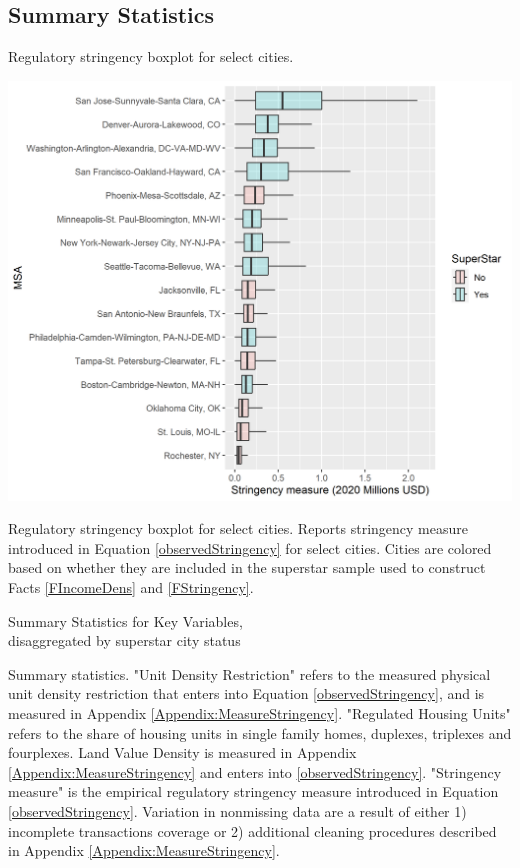 \documentclass[12pt]{article}
\begin{document}
	
	\clearpage
	
	\subsection{Summary Statistics}\label{Appendix:FactsSummaryStats}
	\begin{table}[htbp!]	
		\caption{Regulatory stringency boxplot for select cities.}\label{table:BoxplotStringency}
		\includegraphics[width=\textwidth]{Facts_incomeStringency_boxplot.png}
		\caption*{Regulatory stringency boxplot for select cities. Reports stringency measure introduced in Equation \eqref{observedStringency} for select cities. Cities are colored based on whether they are included in the superstar sample used to construct Facts \ref{FIncomeDens} and \ref{FStringency}. }
	\end{table}
	
	\clearpage
	
	
	\begin{table}
		\caption{Summary Statistics for Key Variables, \\
					 disaggregated by superstar city status}
		
		\makebox[\textwidth]{}\label{table:FactsStats}
		\caption*{Summary statistics. "Unit Density Restriction" refers to the measured physical unit density restriction that enters into Equation \eqref{observedStringency}, and is measured in Appendix \ref{Appendix:MeasureStringency}. "Regulated Housing Units" refers to the share of housing units in single family homes, duplexes, triplexes and fourplexes. Land Value Density is measured in Appendix \ref{Appendix:MeasureStringency} and enters into \eqref{observedStringency}. "Stringency measure" is the empirical regulatory stringency measure introduced in Equation \eqref{observedStringency}.  Variation in nonmissing data are a result of either 1) incomplete transactions coverage or 2) additional cleaning procedures described in Appendix \ref{Appendix:MeasureStringency}.}
	\end{table}
	
\end{document}
